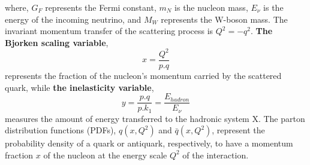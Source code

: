 where, $G_F$ represents the Fermi constant, $m_N$ is the nucleon mass, $E_{\nu}$ is the energy of the incoming neutrino, and $M_W$ represents the W-boson mass. The invariant momentum transfer of the scattering process is $Q^2 = -q^2$. \textbf{The Bjorken scaling variable}, 
\begin{equation}\label{eq:bjorkenx}
        x = \frac{Q^2}{p.q}
\end{equation}
represents the fraction of the nucleon's momentum carried by the scattered quark, while \textbf{the inelasticity variable}, 
\begin{equation}\label{eq:inelasticity}
        y = \frac{p.q}{p.k_1}=\frac{E_{hadron}}{E_{\nu}}
\end{equation}
measures the amount of energy transferred to the hadronic system X. The parton distribution functions (PDFs), $q(x, Q^2)$ and $\bar{q}(x, Q^2)$, represent the probability density of a quark or antiquark, respectively, to have a momentum fraction $x$ of the nucleon at the energy scale $Q^2$ of the interaction. 

